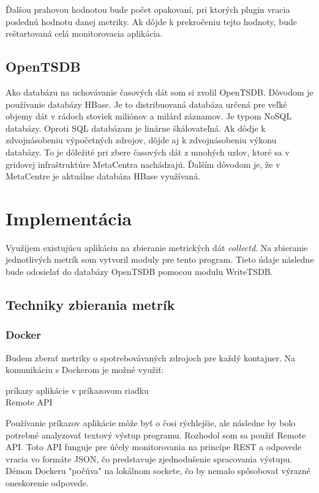 \documentclass[11pt,final,oneside]{fithesis}
\begin{document}
Ďalšou prahovou hodnotou bude počet opakovaní, pri ktorých plugin vracia poslednú hodnotu danej metriky. Ak dôjde k prekročeniu tejto hodnoty, bude reštartovaná celá monitorovacia aplikácia.

\section{OpenTSDB}
Ako databázu na uchovávanie časových dát som si zvolil OpenTSDB. Dôvodom je používanie databázy HBase. Je to distribuovaná databáza určená pre veľké objemy dát v rádoch stoviek miliónov a milárd záznamov. 
Je typom NoSQL databázy. Oproti SQL databázam je linárne škálovateľná. Ak dôdje k zdvojnásobeniu výpočetných zdrojov, dôjde aj k zdvojnásobeniu výkonu databázy. To je dôležité pri zbere časových dát z mnohých uzlov,
ktoré sa v gridovej infraštruktúre MetaCentra nachádzajú. Ďalším dôvodom je, že v MetaCentre je aktuálne databáza HBase využívaná.


\chapter{Implementácia}
Využijem existujúcu aplikáciu na zbieranie metrických dát \emph{collectd}. Na zbieranie jednotlivých metrík som vytvoril moduly pre tento program. Tieto údaje následne bude odosielať do databázy OpenTSDB
pomocou modulu WriteTSDB.

\section{Techniky zbierania metrík}



\subsection{Docker}
Budem zberať metriky o spotrebovávaných zdrojoch pre každý kontajner. Na komunikáciu s Dockerom je možné využiť:
\begin{description}
\item[príkazy aplikácie v príkazovom riadku]
\item[Remote API]
\end{description}

Používanie príkazov aplikácie môže byť o čosi rýchlejšie, ale následne by bolo potrebné analyzovať textový výstup programu.
Rozhodol som sa použiť Remote API. Toto API funguje pre účely monitorovania na princípe REST a odpovede vracia vo formáte JSON, čo predstavuje zjednodušenie spracovania výstupu. Démon Dockeru "počúva" na 
lokálnom sockete, čo by nemalo spôsobovať výrazné oneskorenie odpovede.
\end{document}
